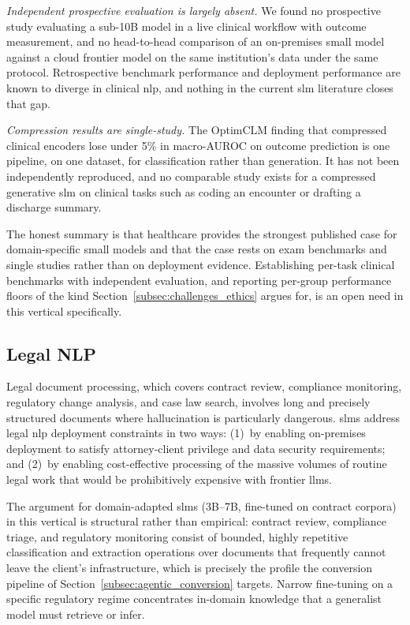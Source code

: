 \emph{Independent prospective evaluation is largely absent.} We found no
prospective study evaluating a sub-10B model in a live clinical workflow with
outcome measurement, and no head-to-head comparison of an on-premises small model
against a cloud frontier model on the same institution's data under the same
protocol. Retrospective benchmark performance and deployment performance are
known to diverge in clinical \gls{nlp}, and nothing in the current \gls{slm}
literature closes that gap.

\emph{Compression results are single-study.} The OptimCLM finding
\citep{hasan2024optimclm} that compressed clinical encoders lose under 5\% in
macro-AUROC on outcome prediction is one pipeline, on one dataset, for
classification rather than generation. It has not been independently reproduced,
and no comparable study exists for a compressed generative \gls{slm} on clinical
tasks such as coding an encounter or drafting a discharge summary.

The honest summary is that healthcare provides the strongest published case for
domain-specific small models and that the case rests on exam benchmarks and
single studies rather than on deployment evidence. Establishing per-task clinical
benchmarks with independent evaluation, and reporting per-group performance
floors of the kind Section~\ref{subsec:challenges_ethics} argues for, is an open
need in this vertical specifically.

\subsection{Legal NLP}
\label{subsec:applications_legal}

Legal document processing, which covers contract review, compliance monitoring, regulatory change analysis, and case law search, involves long and precisely structured documents where hallucination is particularly dangerous. \glspl{slm} address legal \gls{nlp} deployment constraints in two ways: (1)~by enabling on-premises deployment to satisfy attorney-client privilege and data security requirements; and (2)~by enabling cost-effective processing of the massive volumes of routine legal work that would be prohibitively expensive with frontier \glspl{llm}.

The argument for domain-adapted \glspl{slm} (3B--7B, fine-tuned on contract corpora) in this vertical is structural rather than empirical: contract review, compliance triage, and regulatory monitoring consist of bounded, highly repetitive classification and extraction operations over documents that frequently cannot leave the client's infrastructure, which is precisely the profile the conversion pipeline of Section~\ref{subsec:agentic_conversion} targets. Narrow fine-tuning on a specific regulatory regime concentrates in-domain knowledge that a generalist model must retrieve or infer.

